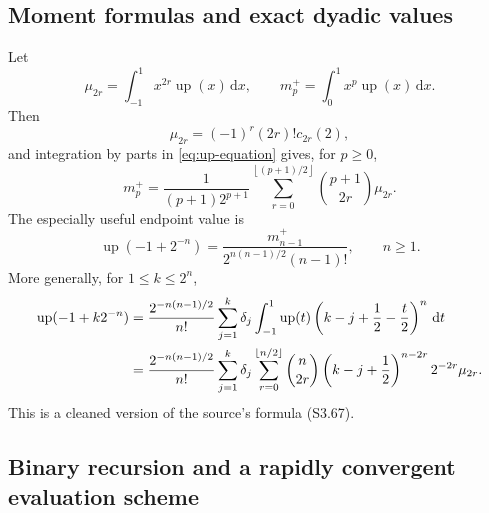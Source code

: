 \documentclass[11pt,oneside]{article}
\theoremstyle{definition}
\theoremstyle{remark}
\newcommand{\Up}{\operatorname{up}}
\newcommand{\dd}{\,\mathrm d}
\newcommand{\floor}[1]{\left\lfloor #1\right\rfloor}
\begin{document}
\subsection{Moment formulas and exact dyadic values}

Let
\begin{equation}
 \mu_{2r}=\int_{-1}^{1}x^{2r}\Up(x)\dd x,
 \qquad
 m_p^+=\int_0^1x^p\Up(x)\dd x.
 \label{eq:up-moments}
\end{equation}
Then
\begin{equation}
 \mu_{2r}=(-1)^r(2r)!c_{2r}(2),
 \tag{S3.65}
 \label{eq:up-even-moment}
\end{equation}
and integration by parts in \eqref{eq:up-equation} gives, for $p\ge0$,
\begin{equation}
 m_p^+=\frac1{(p+1)2^{p+1}}
 \sum_{r=0}^{\floor{(p+1)/2}}
 \binom{p+1}{2r}\mu_{2r}.
 \label{eq:half-moment-recurrence}
\end{equation}
The especially useful endpoint value is
\begin{equation}
 \Up(-1+2^{-n})=
 \frac{m_{n-1}^+}{2^{n(n-1)/2}(n-1)!},
 \qquad n\ge1.
 \tag{S3.68}
 \label{eq:up-endpoint-dyadic}
\end{equation}
More generally, for $1\le k\le2^n$,
\begin{align}
 \Up(-1+k2^{-n})
 &=\frac{2^{-n(n-1)/2}}{n!}
 \sum_{j=1}^{k}\delta_j
 \int_{-1}^{1}\Up(t)
 \left(k-j+\frac12-\frac t2\right)^n\dd t \notag\\
 &=\frac{2^{-n(n-1)/2}}{n!}
 \sum_{j=1}^{k}\delta_j
 \sum_{r=0}^{\floor{n/2}}
 \binom n{2r}\left(k-j+\frac12\right)^{n-2r}2^{-2r}\mu_{2r}.
 \label{eq:up-general-dyadic}
\end{align}
This is a cleaned version of the source's formula (S3.67).

\subsection{Binary recursion and a rapidly convergent evaluation scheme}
\end{document}

